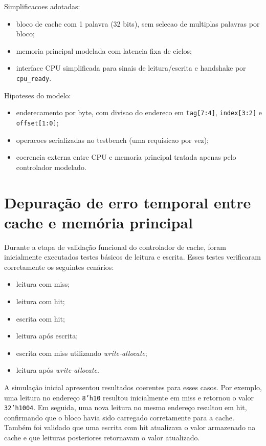 ﻿\documentclass[12pt,a4paper]{article}
\begin{document}
Simplificacoes adotadas:
\begin{itemize}
    \item bloco de cache com 1 palavra (32 bits), sem selecao de multiplas palavras por bloco;
    \item memoria principal modelada com latencia fixa de ciclos;
    \item interface CPU simplificada para sinais de leitura/escrita e handshake por \texttt{cpu\_ready}.
\end{itemize}

Hipoteses do modelo:
\begin{itemize}
    \item enderecamento por byte, com divisao do endereco em \texttt{tag[7:4]}, \texttt{index[3:2]} e \texttt{offset[1:0]};
    \item operacoes serializadas no testbench (uma requisicao por vez);
    \item coerencia externa entre CPU e memoria principal tratada apenas pelo controlador modelado.
\end{itemize}
\section{Depuração de erro temporal entre cache e memória principal}

Durante a etapa de validação funcional do controlador de cache, foram inicialmente executados testes básicos de leitura e escrita. Esses testes verificaram corretamente os seguintes cenários:

\begin{itemize}
    \item leitura com miss;
    \item leitura com hit;
    \item escrita com hit;
    \item leitura após escrita;
    \item escrita com miss utilizando \textit{write-allocate};
    \item leitura após \textit{write-allocate}.
\end{itemize}

A simulação inicial apresentou resultados coerentes para esses casos. Por exemplo, uma leitura no endereço \texttt{8'h10} resultou inicialmente em miss e retornou o valor \texttt{32'h1004}. Em seguida, uma nova leitura no mesmo endereço resultou em hit, confirmando que o bloco havia sido carregado corretamente para a cache. Também foi validado que uma escrita com hit atualizava o valor armazenado na cache e que leituras posteriores retornavam o valor atualizado.
\end{document}
